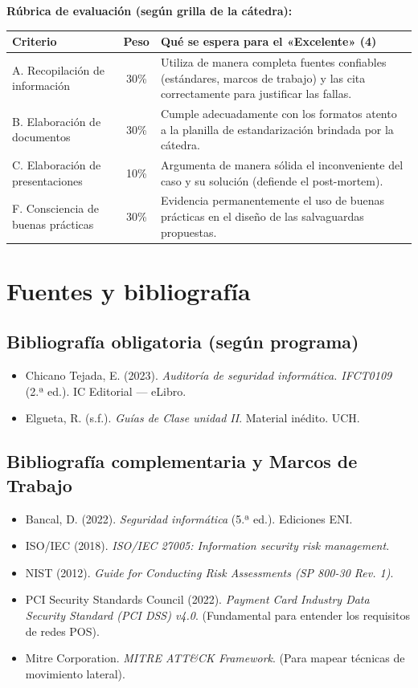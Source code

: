 \documentclass[11pt,a4paper]{article}
\begin{document}
\textbf{Rúbrica de evaluación (según grilla de la cátedra):}
\begin{center}
\renewcommand{\arraystretch}{1.2}
\begin{tabularx}{\textwidth}{@{} l c X @{}}
\toprule
\textbf{Criterio} & \textbf{Peso} & \textbf{Qué se espera para el «Excelente» (4)} \\
\midrule
A. Recopilación de información & 30\% & Utiliza de manera completa fuentes confiables (estándares, marcos de trabajo) y las cita correctamente para justificar las fallas. \\
B. Elaboración de documentos & 30\% & Cumple adecuadamente con los formatos atento a la planilla de estandarización brindada por la cátedra. \\
C. Elaboración de presentaciones & 10\% & Argumenta de manera sólida el inconveniente del caso y su solución (defiende el post-mortem). \\
F. Consciencia de buenas prácticas & 30\% & Evidencia permanentemente el uso de buenas prácticas en el diseño de las salvaguardas propuestas. \\
\bottomrule
\end{tabularx}
\end{center}

\section{Fuentes y bibliografía}

\subsection{Bibliografía obligatoria (según programa)}
\begin{itemize}[leftmargin=*]
  \item Chicano Tejada, E. (2023). \textit{Auditoría de seguridad informática. IFCT0109} (2.ª ed.). IC Editorial --- eLibro.
  \item Elgueta, R. (s.f.). \textit{Guías de Clase unidad II}. Material inédito. UCH.
\end{itemize}

\subsection{Bibliografía complementaria y Marcos de Trabajo}
\begin{itemize}[leftmargin=*]
  \item Bancal, D. (2022). \textit{Seguridad informática} (5.ª ed.). Ediciones ENI.
  \item ISO/IEC (2018). \textit{ISO/IEC 27005: Information security risk management}.
  \item NIST (2012). \textit{Guide for Conducting Risk Assessments (SP 800-30 Rev. 1)}.
  \item PCI Security Standards Council (2022). \textit{Payment Card Industry Data Security Standard (PCI DSS) v4.0}. (Fundamental para entender los requisitos de redes POS).
  \item Mitre Corporation. \textit{MITRE ATT\&CK Framework}. (Para mapear técnicas de movimiento lateral).
\end{itemize}
\end{document}
